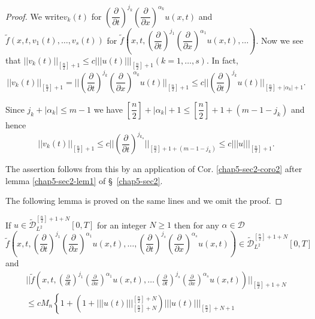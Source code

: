 \begin{proof}
We write\pageoriginale $v_k(t)$ for $\left(\dfrac{\partial}{\partial
  t}\right)^{j_k} 
\left(\dfrac{\partial}{\partial x}\right)^{\alpha_k} u(x, t)$ and
$\tilde{f} (x, t, v_1 (t), \ldots, v_s(t))$ for $\tilde{f} \left(x, t,
\left(\dfrac{\partial}{\partial t}\right)^{j_1} \left(\dfrac{\partial}{\partial
  x}\right)^{\alpha_1} u(x, t), \ldots \right)$. Now we see that
$||v_k(t)||_{\left[\frac{n}{2}\right] + 1} \leq c ||| u (t)
|||_{\left[\frac{n}{2}\right]+1} (k = 1, \ldots, s)$. In fact,  
$$
||v_k (t)||_{\left[\frac{n}{2}\right]+1}= || \left(\frac{\partial}{\partial
  t}\right)^{j_k}\left(\frac{\partial}{\partial x}\right)^{\alpha_k}
u(t)||_{\left[\frac{n}{2}\right]+1} \leq  c || \left(\frac{\partial}{\partial
  t}\right)^{j_k} u(t) ||_{\left[\frac{n}{2}\right]+|\alpha_k | +1}. 
$$

Since $ j_k + | \alpha_k | \leq m-1$ we have $\left[\dfrac{n}{2}\right] + |
\alpha_k | + 1 \leq \left[\dfrac{n}{2}\right]+1 + (m-1-j_k)$ and hence  
$$
|| v_k (t) ||_{[\frac{n}{2}]+1} \leq c ||\left(\frac{\partial}{\partial
  t}\right)^{j_{k_u}}||_{[\frac{n}{2}]+1 + (m-1-j_k)} \leq c ||| u
|||_{[\frac{n}{2}]+1}. 
$$

The assertion follows from this by an application of
Cor. \ref{chap5-sec2-coro2} after lemma \ref{chap5-sec2-lem1} of
\S\ \ref{chap5-sec2}.  

The following lemma is proved on the same lines and we omit the
proof. 
\end{proof}

\begin{lemma}\label{chap5-sec5-lem2}%
If $u \in \tilde{\mathscr{D}}^{\left[\frac{n}{2}\right]+1+N}_{L^2}
[0,T]$ for an integer $N \geq 1$ then for any $ \alpha \in
\mathscr{D}$ 
$$
 \tilde{f} \left(x, t, \left(\frac{\partial}{\partial t}\right)^{j_1}
\left(\frac{\partial}{\partial x}\right)^{\alpha_1} u(x,t), \ldots,
\left(\frac{\partial}{\partial t}\right)^{j_s}\left(\frac{\partial}{\partial
  x}\right)^{\alpha_s} u(x,t)\right) \in
\tilde{\mathscr{D}}^{\left[\frac{n}{2}\right]+1+N}_{L^2} [0,T] 
$$
and
\begin{gather*}
|| \tilde{f}\left(x, t, \left(\frac{\partial}{\partial t}\right)^{j_1}
\left(\frac{\partial}{\partial x}\right)^{\alpha_1} u(x, t), \ldots
\left(\frac{\partial}{\partial t}\right)^{j_s} \left(\frac{\partial}{\partial
  x}\right)^{\alpha_s} u(x, t)\right)||_{\left[\frac{n}{2} \right]+1+N} \\ 
\leq c M_n \left\{ 1+ \left(1+|||
u(t)|||^{\left[\frac{n}{2} \right]+N}_{\left[\frac{n}{2}\right]+N}\right) ||| u(t)
|||_{\left[\frac{n}{2}\right]+N+1} \right. \tag{5.6}\label{chap5-eq5.6} 
\end{gather*}
\end{lemma}

